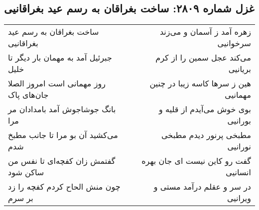 \begin{center}
\section*{غزل شماره ۲۸۰۹: ساخت بغراقان به رسم عید بغراقانیی}
\label{sec:2809}
\begin{longtable}{l p{0.5cm} r}
ساخت بغراقان به رسم عید بغراقانیی
&&
زهره آمد ز آسمان و می‌زند سرخوانیی
\\
جبرئیل آمد به مهمان بار دیگر تا خلیل
&&
می‌کند عجل سمین را از کرم بریانیی
\\
روز مهمانی است امروز الصلا جان‌های پاک
&&
هین ز سرها کاسه زیبا در چنین مهمانیی
\\
بانگ جوشاجوش آمد بامدادان مر مرا
&&
بوی خوش می‌آیدم از قلیه و بورانیی
\\
می‌کشید آن بو مرا تا جانب مطبخ شدم
&&
مطبخی پرنور دیدم مطبخی نورانیی
\\
گفتمش زان کفچه‌ای تا نفس من ساکن شود
&&
گفت رو کاین نیست ای جان بهره انسانیی
\\
چون منش الحاح کردم کفچه را زد بر سرم
&&
در سر و عقلم درآمد مستی و ویرانیی
\\
\end{longtable}
\end{center}
